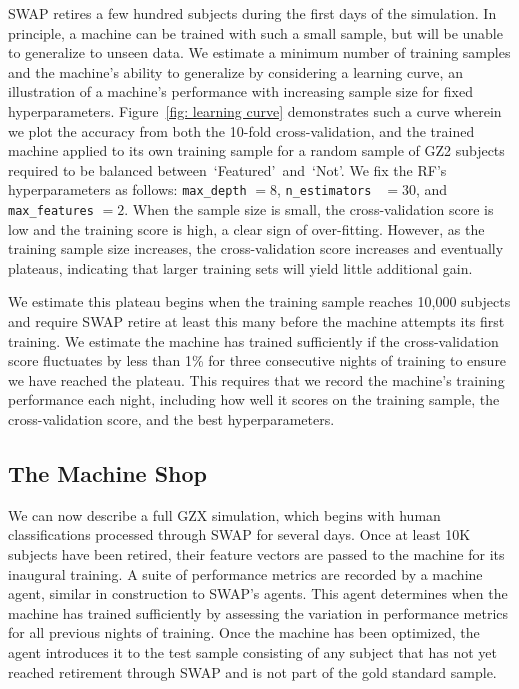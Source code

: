 \documentclass[twocolumn,  trackchanges,]{aastex6}%
\newcommand{\feat}{`Featured'}
\newcommand{\notfeat}{`Not'}
\begin{document}
SWAP retires a few hundred subjects during the first days of the simulation.
In principle,  a machine can be trained with such a small sample, but will be unable
to generalize to unseen data. We estimate a minimum number of training samples
and the machine's ability to generalize by considering a learning curve, an illustration
of a machine's performance with increasing sample size for fixed hyperparameters. 
Figure~\ref{fig: learning curve} demonstrates such a curve wherein we plot
the accuracy from both the 10-fold cross-validation, and the trained machine
applied to its own training sample for a random sample of GZ2 subjects
required to be balanced between~\feat~and~\notfeat.  
We fix the RF's hyperparameters as follows: \texttt{max\_depth} $=8$, 
\texttt{n\_estimators } $=30$, and \texttt{max\_features} $=2$. 
When the sample size is small, the cross-validation score is low and the training 
score is high, a clear sign of over-fitting.  However, as the training 
sample size increases, the cross-validation score increases and eventually plateaus,
 indicating that larger training sets will yield little additional gain. 

We estimate this plateau begins when the training 
sample reaches 10,000 subjects and require SWAP retire at least this many 
 before the machine attempts its first training.  We estimate the machine 
has trained sufficiently if the cross-validation score fluctuates by less than 1\% 
for three consecutive nights of training to ensure we have reached the plateau.  
This requires that we record the machine's training performance each night, 
including how well it scores on the training sample, the 
cross-validation score, and the best hyperparameters. 



\subsection{The Machine Shop}\label{sec: machine shop}
We can now describe a full GZX simulation, which begins with human classifications 
processed through SWAP for several days.   
Once at least 10K subjects have been retired, their feature vectors are passed to 
the machine for its inaugural training. 
A suite of performance metrics are recorded by a machine agent, similar
in construction to SWAP's agents. This agent determines 
when the machine has trained sufficiently by assessing the variation
in performance metrics for all previous nights of training. 
Once the machine has been optimized, the agent introduces it to the test sample
consisting of any subject that has not yet reached retirement through SWAP 
and is not part of the gold standard sample.  
\end{document}
